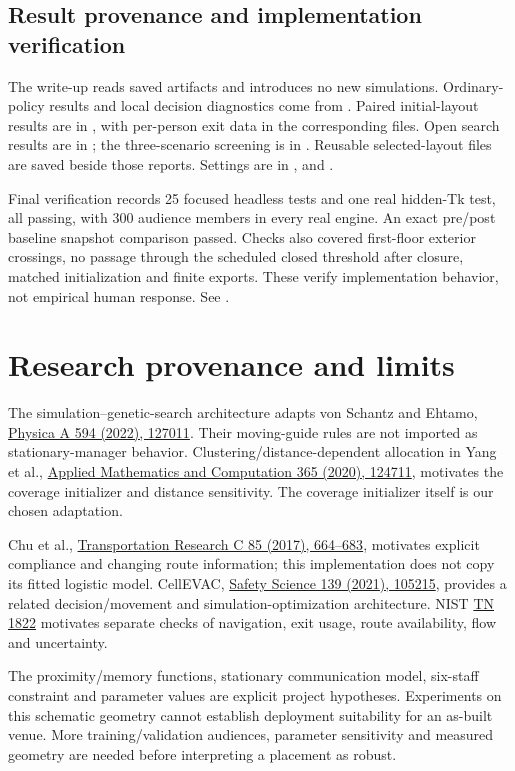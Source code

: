 \documentclass[11pt]{article}
\newcommand{\code}[1]{\texttt{\detokenize{#1}}}
\begin{document}
\subsection{Result provenance and implementation verification}
The write-up reads saved artifacts and introduces no new simulations.
Ordinary-policy results and local decision diagnostics come from
. Paired initial-layout
results are in , with per-person
exit data in the corresponding \code{crowd-check-*-300.json} files.
Open search results are in ; the
three-scenario screening is in .
Reusable selected-layout files are saved beside those reports. Settings are
in , 
and .

Final verification records 25 focused headless tests and one real hidden-Tk
test, all passing, with 300 audience members in every real engine. An exact
pre/post baseline snapshot comparison passed. Checks also covered first-floor
exterior crossings, no passage through the scheduled closed threshold after
closure, matched initialization and finite exports. These verify implementation
behavior, not empirical human response. See
.

\section{Research provenance and limits}
The simulation--genetic-search architecture adapts von Schantz and Ehtamo,
\href{https://doi.org/10.1016/j.physa.2022.127011}{Physica A 594 (2022), 127011}.
Their moving-guide rules are not imported as stationary-manager behavior.
Clustering/distance-dependent allocation in Yang et al.,
\href{https://doi.org/10.1016/j.amc.2019.124711}{Applied Mathematics and Computation 365 (2020), 124711},
motivates the coverage initializer and distance sensitivity. The coverage
initializer itself is our chosen adaptation.

Chu et al., \href{https://doi.org/10.1016/j.trc.2017.10.009}{Transportation Research C 85 (2017), 664--683},
motivates explicit compliance and changing route information; this implementation
does not copy its fitted logistic model. CellEVAC,
\href{https://doi.org/10.1016/j.ssci.2021.105215}{Safety Science 139 (2021), 105215},
provides a related decision/movement and simulation-optimization architecture.
NIST \href{https://doi.org/10.6028/NIST.TN.1822}{TN 1822} motivates separate
checks of navigation, exit usage, route availability, flow and uncertainty.

The proximity/memory functions, stationary communication model, six-staff
constraint and parameter values are explicit project hypotheses. Experiments
on this schematic geometry cannot establish deployment suitability for an
as-built venue. More training/validation audiences, parameter sensitivity and
measured geometry are needed before interpreting a placement as robust.
\end{document}
